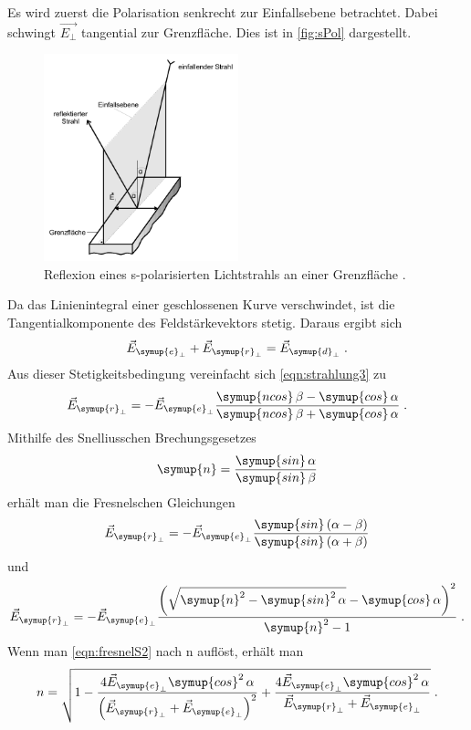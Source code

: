 Es wird zuerst die Polarisation senkrecht zur Einfallsebene betrachtet. Dabei schwingt $\vec{E_{\perp}}$ tangential zur Grenzfläche. Dies ist in 
\autoref{fig:sPol} dargestellt. 
\begin{figure}
    \centering
    \includegraphics[height = 6cm]{sPol.pdf}
    \caption{Reflexion eines s-polarisierten Lichtstrahls an einer Grenzfläche \cite{ap407}.}
    \label{fig:sPol}
\end{figure}
Da das Linienintegral einer geschlossenen Kurve verschwindet, ist die Tangentialkomponente des Feldstärkevektors stetig. Daraus ergibt sich
\begin{equation*}
    \vec{E}_{\symup{e}_{\perp}} + \vec{E}_{\symup{r}_{\perp}} = \vec{E}_{\symup{d}_{\perp}} \; .
\end{equation*}
Aus dieser Stetigkeitsbedingung vereinfacht sich \autoref{eqn:strahlung3} zu 
\begin{equation*}
    \vec{E}_{\symup{r}_{\perp}} = - \vec{E}_{\symup{e}_{\perp}} \frac{\symup{ncos}\,\beta - \symup{cos}\,\alpha}{\symup{ncos}\,\beta + \symup{cos}\,\alpha} \; .
\end{equation*}
Mithilfe des Snelliusschen Brechungsgesetzes
\begin{equation*}
    \symup{n} = \frac{\symup{sin}\, \alpha}{\symup{sin}\, \beta}
\end{equation*}
erhält man die Fresnelschen Gleichungen 
\begin{equation*}
    \vec{E}_{\symup{r}_{\perp}} = - \vec{E}_{\symup{e}_{\perp}} \frac{\symup{sin}\left(\alpha - \beta\right)}{\symup{sin}\left(\alpha + \beta\right)}
\end{equation*}
und
\begin{equation}
    \vec{E}_{\symup{r}_{\perp}} = - \vec{E}_{\symup{e}_{\perp}} \frac{\left(\sqrt{\symup{n}^2-\symup{sin}^2 \, \alpha}-\symup{cos}\, \alpha\right)^2}{\symup{n}^2 - 1} \; .
    \label{eqn:fresnelS2}
\end{equation}
Wenn man \autoref{eqn:fresnelS2} nach n auflöst, erhält man
\begin{equation}
    n = \sqrt{1-\frac{4\vec{E}_{\symup{e}_{\perp}}\symup{cos}^2\, \alpha}{\left(\vec{E}_{\symup{r}_{\perp}}+\vec{E}_{\symup{e}_{\perp}}\right)^2}+\frac{4\vec{E}_{\symup{e}_{\perp}}\symup{cos}^2\, \alpha}{\vec{E}_{\symup{r}_{\perp}}+\vec{E}_{\symup{e}_{\perp}}}} \; .
    \label{eqn: n1}
\end{equation}

